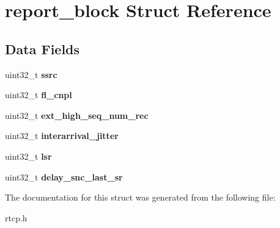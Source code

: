 \section{report\+\_\+block Struct Reference}
\label{structreport__block}
\subsection*{Data Fields}
\begin{DoxyCompactItemize}
\item 
\mbox{\label{structreport__block_ae377b73335f939f2c5c1dddca57bcf12}} 
uint32\+\_\+t {\bfseries ssrc}
\item 
\mbox{\label{structreport__block_a873119a249db2e47395e8d805f07d5a6}} 
uint32\+\_\+t {\bfseries fl\+\_\+cnpl}
\item 
\mbox{\label{structreport__block_ac82a411b4029e7afdeb50231ce16aaf8}} 
uint32\+\_\+t {\bfseries ext\+\_\+high\+\_\+seq\+\_\+num\+\_\+rec}
\item 
\mbox{\label{structreport__block_a1f394052d521749e4b849293f0e28ab2}} 
uint32\+\_\+t {\bfseries interarrival\+\_\+jitter}
\item 
\mbox{\label{structreport__block_a02b9591c0898e1fbdb183113aadafaba}} 
uint32\+\_\+t {\bfseries lsr}
\item 
\mbox{\label{structreport__block_a6edc79ba67a45c529ebb87dfdbe07f58}} 
uint32\+\_\+t {\bfseries delay\+\_\+snc\+\_\+last\+\_\+sr}
\end{DoxyCompactItemize}


The documentation for this struct was generated from the following file\+:\begin{DoxyCompactItemize}
\item 
rtcp.\+h\end{DoxyCompactItemize}
